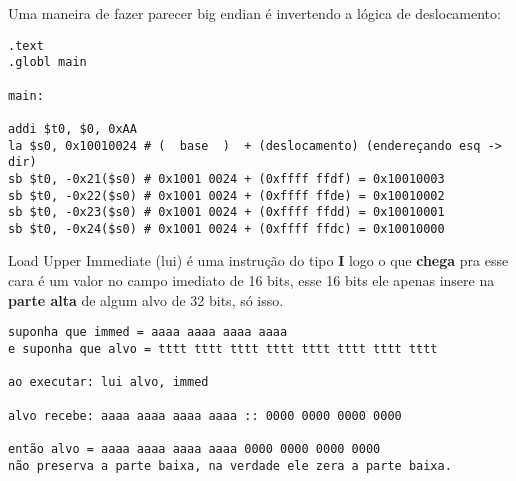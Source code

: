 \documentclass{article}
\begin{document}
Uma maneira de fazer parecer big endian é invertendo a lógica de deslocamento:

\begin{verbatim}
.text
.globl main

main:

addi $t0, $0, 0xAA
la $s0, 0x10010024 # (  base  )  + (deslocamento) (endereçando esq -> dir)
sb $t0, -0x21($s0) # 0x1001 0024 + (0xffff ffdf) = 0x10010003
sb $t0, -0x22($s0) # 0x1001 0024 + (0xffff ffde) = 0x10010002
sb $t0, -0x23($s0) # 0x1001 0024 + (0xffff ffdd) = 0x10010001
sb $t0, -0x24($s0) # 0x1001 0024 + (0xffff ffdc) = 0x10010000
\end{verbatim}

Load Upper Immediate (lui) é uma instrução do tipo \textbf{I} logo o que 
\textbf{chega} pra esse cara é um valor no campo imediato de 16 bits, esse 16 
bits ele apenas insere na \textbf{parte alta} de algum alvo de 32 bits, só isso.

\begin{verbatim}
suponha que immed = aaaa aaaa aaaa aaaa
e suponha que alvo = tttt tttt tttt tttt tttt tttt tttt tttt

ao executar: lui alvo, immed

alvo recebe: aaaa aaaa aaaa aaaa :: 0000 0000 0000 0000

então alvo = aaaa aaaa aaaa aaaa 0000 0000 0000 0000
não preserva a parte baixa, na verdade ele zera a parte baixa.
\end{verbatim}
\end{document}
